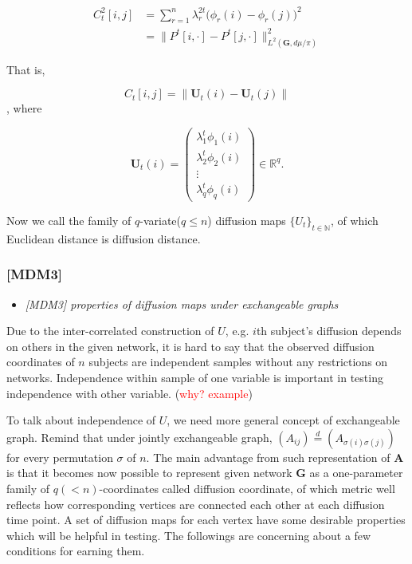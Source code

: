 \documentclass[12pt]{article}
\theoremstyle{definition}
\begin{document}
 \begin{equation}
 \begin{split}
 C^2_{t}[i,j] & = \sum\limits_{r=1}^{n} \lambda^{2t}_{r} \big( \phi_{r} (i) - \phi_{r}(j)   \big)^2   \\ &  = \parallel P^{t}[i, \cdot] - P^{t}[j, \cdot]  \parallel^2_{L^{2}(\boldsymbol{G}, d\mu / \pi)  }
 \end{split}
 \end{equation}
 
 That is,
 
 \begin{equation}
 C_{t}[i,j] = \parallel \boldsymbol{U}_{t}(i) - \boldsymbol{U}_{t}(j) \parallel
 \end{equation}
 , where 

\begin{equation} 
 \boldsymbol{U}_{t}(i) = \begin{pmatrix} \lambda^{t}_{1} \phi_{1}(i) \\ \lambda^{t}_{2} \phi_{2} (i)  \\ \vdots \\ \lambda^{t}_{q} \phi_{q}(i) \end{pmatrix} \in \mathbb{R}^{q}.
 \end{equation}


Now we call the family of $q$-variate($q \leq n$) diffusion maps $\{ U_{t} \}_{t \in \mathbb{N}}$, of which Euclidean distance is diffusion distance.


\subsubsection{[MDM3]}
\begin{itemize}
	\item {\it  [MDM3] properties of diffusion maps under exchangeable graphs \/}
\end{itemize}

Due to the inter-correlated construction of $U$, e.g. $i$th subject's diffusion depends on others in the given network, it is hard to say that the observed diffusion coordinates of $n$ subjects are independent samples without any restrictions on networks. Independence within sample of one variable is important in testing independence with other variable. (\textcolor{red}{why? example})

To talk about independence of $U$, we need more general concept of exchangeable graph. Remind that under jointly exchangeable graph, $(A_{ij}) \stackrel{d}{=} (A_{\sigma(i) \sigma(j)})$
for every permutation $\sigma$ of $n$. The main advantage from such representation of $\mathbf{A}$ is that it becomes now possible to represent given network $\boldsymbol{G}$ as a one-parameter family of $q(<n)$-coordinates called diffusion coordinate, of which metric well reflects how corresponding vertices are connected each other at each diffusion time point. A set of diffusion maps for each vertex have some desirable properties which will be helpful in testing. The followings are concerning about a few conditions for earning them. 
\end{document}
